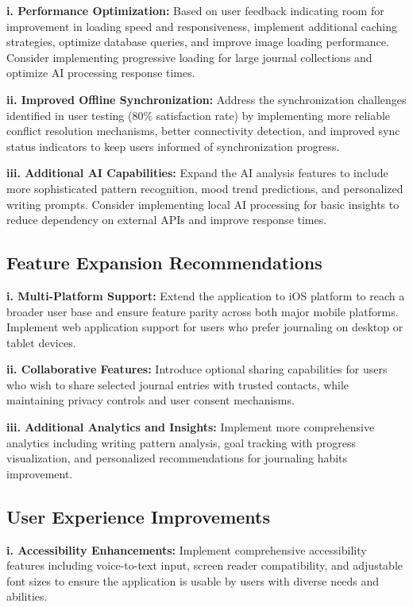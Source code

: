 \textbf{i. Performance Optimization:} Based on user feedback indicating room for improvement in loading speed and responsiveness, implement additional caching strategies, optimize database queries, and improve image loading performance. Consider implementing progressive loading for large journal collections and optimize AI processing response times.

\textbf{ii. Improved Offline Synchronization:} Address the synchronization challenges identified in user testing (80\% satisfaction rate) by implementing more reliable conflict resolution mechanisms, better connectivity detection, and improved sync status indicators to keep users informed of synchronization progress.

\textbf{iii. Additional AI Capabilities:} Expand the AI analysis features to include more sophisticated pattern recognition, mood trend predictions, and personalized writing prompts. Consider implementing local AI processing for basic insights to reduce dependency on external APIs and improve response times.

\subsection{Feature Expansion Recommendations}

\textbf{i. Multi-Platform Support:} Extend the application to iOS platform to reach a broader user base and ensure feature parity across both major mobile platforms. Implement web application support for users who prefer journaling on desktop or tablet devices.

\textbf{ii. Collaborative Features:} Introduce optional sharing capabilities for users who wish to share selected journal entries with trusted contacts, while maintaining privacy controls and user consent mechanisms.

\textbf{iii. Additional Analytics and Insights:} Implement more comprehensive analytics including writing pattern analysis, goal tracking with progress visualization, and personalized recommendations for journaling habits improvement.

\subsection{User Experience Improvements}

\textbf{i. Accessibility Enhancements:} Implement comprehensive accessibility features including voice-to-text input, screen reader compatibility, and adjustable font sizes to ensure the application is usable by users with diverse needs and abilities.

